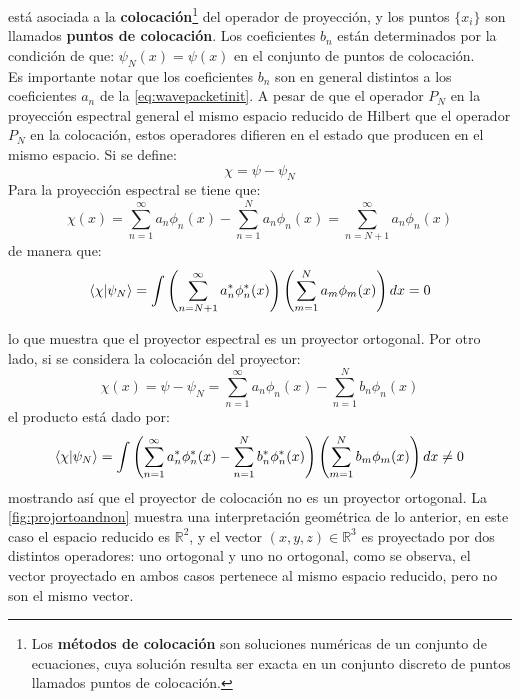 está asociada a la \textbf{colocación}\footnote{Los \textbf{métodos de colocación} son soluciones numéricas de un conjunto de ecuaciones, cuya solución resulta ser exacta en un conjunto discreto de puntos llamados puntos de colocación.\cite{Tannor:2006}} del operador de proyección, y los puntos $\{x_i\}$ son llamados \textbf{puntos de colocación}. Los coeficientes $b_n$ están determinados por la condición de que: $\psi_N(x)=\psi(x)$ en el conjunto de puntos de colocación.
\\
Es importante notar que los coeficientes $b_n$ son en general distintos a los coeficientes $a_n$ de la \autoref{eq:wavepacketinit}. A pesar de que el operador $P_N$ en la proyección espectral general el mismo espacio reducido de Hilbert que el operador $P_N$ en la colocación, estos operadores difieren en el estado que producen en el mismo espacio. Si se define:
\begin{equation}
  \label{eq:chi}
  \chi = \psi - \psi_N
\end{equation}
Para la proyección espectral se tiene que:
\begin{equation}
  \label{eq:ortochi}
  \chi(x) = \sum_{n=1}^{\infty} a_n\phi_n(x) - \sum_{n=1}^{N} a_n\phi_n(x)=\sum_{n=N+1}^{\infty} a_n\phi_n(x)
\end{equation}
de manera que:
\begin{equation}
  \label{eq:puntoorto}
  \bra{\chi}\ket{\psi_N}= \int \left( \sum_{n=N+1}^{\infty} a_n^*\phi_n^*(x)\right) \left( \sum_{m=1}^{N} a_m\phi_m(x) \right)dx = 0
\end{equation}

lo que muestra que el proyector espectral es un proyector ortogonal. Por otro lado, si se considera la colocación del proyector:
\begin{equation}
  \label{eq:chinon}
  \chi(x) = \psi - \psi_N = \sum_{n=1}^{\infty} a_n\phi_n(x) - \sum_{n=1}^{N} b_n\phi_n(x)
\end{equation}
el producto está dado por:
\begin{equation}
  \label{eq:puntonon}
  \bra{\chi}\ket{\psi_N}= \int \left(\sum_{n=1}^{\infty} a_n^*\phi_n^*(x) - \sum_{n=1}^{N} b_n^*\phi_n^*(x) \right)
  \left(  \sum_{m=1}^{N} b_m\phi_m(x)  \right) dx \neq 0
\end{equation}
mostrando así que el proyector de colocación no es un proyector ortogonal. La \autoref{fig:projortoandnon} muestra una interpretación geométrica de lo anterior, en este caso el espacio reducido es $\mathbb{R}^2$, y el vector $(x,y,z) \in \mathbb{R}^3$ es proyectado por dos distintos operadores: uno ortogonal y uno no ortogonal, como se observa, el vector proyectado en ambos casos pertenece al mismo espacio reducido, pero no son el mismo vector. \cite{Tannor:2006}


